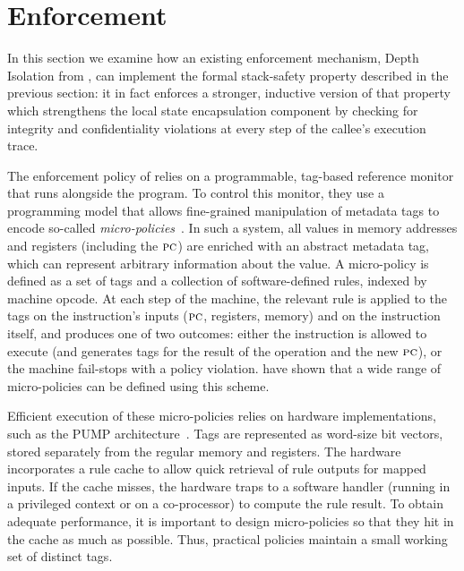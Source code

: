 \documentclass[acmsmall,review,anonymous]{acmart}\settopmatter{printfolios=true,printccs=false,printacmref=false}
\begin{document}
\section{Enforcement}
\label{sec:enforcement}

In this section we examine how an existing enforcement mechanism,
Depth Isolation from \citet{DBLP:conf/sp/RoesslerD18}, can implement
the formal stack-safety property described in the previous section: it in
fact enforces a stronger, inductive version of that property which strengthens the
local state encapsulation component by checking for integrity and
confidentiality violations at every step of the callee's execution trace. 

%
The enforcement policy of \citeauthor{DBLP:conf/sp/RoesslerD18} relies
on a programmable, tag-based reference monitor that runs alongside the
program.  To control this monitor, they use a programming model that
allows fine-grained manipulation of metadata tags to encode so-called
\emph{micro-policies}~\citep{pump_oakland2015}.
In such a system, all values in
memory addresses and registers (including the $\textsc{pc}$)
are enriched with an abstract metadata tag, which can represent
arbitrary information about the value. A micro-policy is defined as a set of tags and a
collection of software-defined rules, indexed by machine opcode.
At each step of the machine, the relevant rule is applied to the tags on
the instruction's inputs ($\textsc{pc}$, registers, memory) and on the instruction itself, and produces
one of two outcomes: either the instruction is allowed to execute (and generates
tags for the result of the operation and the new $\textsc{pc}$), or the machine
fail-stops with a policy violation.
\citeauthor{pump_oakland2015} have shown that a wide range of micro-policies can
be defined using this scheme.

Efficient execution of these micro-policies relies on hardware implementations,
such as the PUMP architecture~\citep{pump:asplos2015}.  Tags are represented
as word-size bit vectors, stored separately from the regular memory and registers.
The hardware incorporates a rule cache
to allow quick retrieval of rule outputs for mapped inputs. If the cache misses,
the hardware traps to a software handler (running in a privileged context or
on a co-processor) to compute the rule result. To obtain adequate performance,
it is important to design micro-policies so that they hit in the cache as
much as possible. Thus, practical policies maintain a small working set of
distinct tags.
\end{document}
